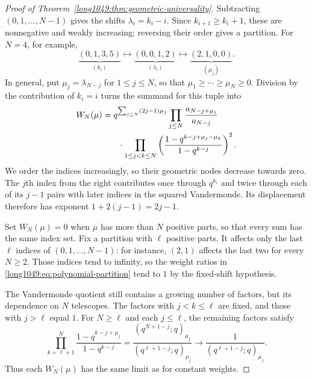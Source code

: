 \begin{proof}[Proof of Theorem~\ref{long1049:thm:geometric-universality}]
Subtracting $(0,1,\ldots,N-1)$ gives the shifts $\lambda_i=k_i-i$.
Since $k_{i+1}\ge k_i+1$, these are nonnegative and weakly increasing;
reversing their order gives a partition. For $N=4$, for example,
\[
 \underbrace{(0,1,3,5)}_{(k_i)}
 \longmapsto\underbrace{(0,0,1,2)}_{(\lambda_i)}
 \longmapsto\underbrace{(2,1,0,0)}_{(\mu_j)}.
\]
In general, put $\mu_j=\lambda_{N-j}$ for $1\le j\le N$, so that
$\mu_1\ge\cdots\ge\mu_N\ge0$. Division by the contribution of
$k_i=i$ turns the summand for this tuple into
\begin{equation}\label{long1049:eq:polynomial-partition}
\begin{split}
 W_N(\mu)={}&q^{\sum_{j\le N}(2j-1)\mu_j}
 \prod_{j\le N}\frac{a_{N-j+\mu_j}}{a_{N-j}}\\
 &\hspace{2mm}\cdot\prod_{1\le j<k\le N}
 \left(\frac{1-q^{k-j+\mu_j-\mu_k}}{1-q^{k-j}}\right)^2.
\end{split}
\end{equation}
We order the indices increasingly, so their geometric nodes decrease
towards zero. The $j$th index from the right contributes once through
$q^{k_i}$ and twice through each of its $j-1$ pairs with later
indices in the squared Vandermonde. Its displacement therefore has exponent
$1+2(j-1)=2j-1$.

Set $W_N(\mu)=0$ when $\mu$ has more than $N$ positive parts,
so that every sum has the same index set. Fix a partition with
$\ell$ positive parts. It affects only the last $\ell$ indices
of $(0,1,\ldots,N-1)$: for instance, $(2,1)$ affects the last two
for every $N\ge2$. Those indices tend to infinity, so the weight
ratios in \eqref{long1049:eq:polynomial-partition} tend to $1$ by the fixed-shift hypothesis.

The Vandermonde quotient still contains a growing number of factors,
but its dependence on $N$ telescopes. The factors with $j<k\le\ell$
are fixed, and those with $j>\ell$ equal $1$. For $N\ge\ell$ and
each $j\le\ell$, the remaining factors satisfy
\begin{equation}\label{long1049:eq:partition-tail}
 \prod_{k=\ell+1}^{N}
 \frac{1-q^{k-j+\mu_j}}{1-q^{k-j}}
 =\frac{(q^{N+1-j};q)_{\mu_j}}{(q^{\ell+1-j};q)_{\mu_j}}
 \longrightarrow\frac1{(q^{\ell+1-j};q)_{\mu_j}}.
\end{equation}
Thus each $W_N(\mu)$ has the same limit as for constant weights.


\end{proof}

